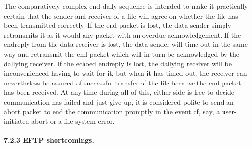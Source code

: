 The comparatively complex end-dally sequence is intended to make it practically certain that the sender and receiver of a file will agree on whether the file has been transmitted correctly. If the end packet is lost, the data sender simply retransmits it as it would any packet with an overdue acknowledgement. If the endreply from the data receiver is lost, the data sender will time out in the same way and retransmit the end packet which will in turn be acknowledged by the dallying receiver. If the echoed endreply is lost, the dallying receiver will be inconvenienced having to wait for it, but when it has timed out, the receiver can nevertheless be assured of successful transfer of the file because the end packet has been received.
At any time during all of this, either side is free to decide communication has failed and just give up, it is considered polite to send an abort packet to end the communication promptly in the event of, say, a user-initiated abort or a file system error.




\paragraph{7.2.3 EFTP shortcomings.}

